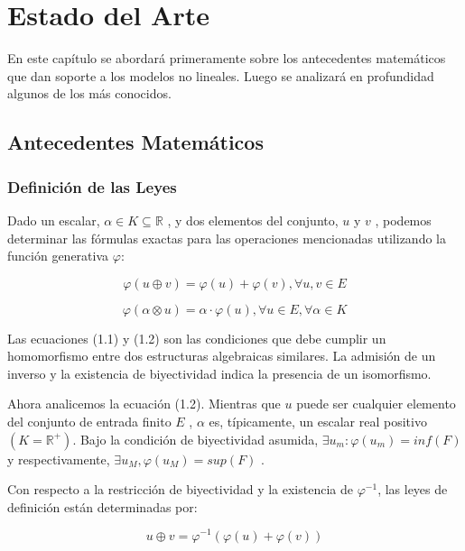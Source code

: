 \chapter{Estado del Arte}\label{chapter:state-of-the-art}

En este cap\'itulo se abordar\'a primeramente sobre los antecedentes matem\'aticos que dan soporte a los modelos no lineales. Luego se analizar\'a en profundidad algunos de los m\'as conocidos.

\section{Antecedentes Matemáticos}

\subsection{Definición de las Leyes}

Dado un escalar, $\alpha \in K \subseteq \mathbb{R}$ , y dos elementos del conjunto, $u$ y $v$ , podemos determinar las fórmulas exactas para las operaciones mencionadas utilizando la función generativa $\varphi$:

\begin{equation}
	\varphi(u\oplus v) = \varphi(u)+\varphi(v), \forall u,v \in E
\end{equation}

\begin{equation}
	\varphi(\alpha \otimes u) = \alpha \cdot \varphi(u), \forall u \in E, \forall \alpha \in K
\end{equation}

Las ecuaciones (1.1) y (1.2) son las condiciones que debe cumplir un homomorfismo entre dos estructuras algebraicas similares. La admisi\'on de un inverso y la existencia de biyectividad indica la presencia de un isomorfismo.

Ahora analicemos la ecuación (1.2). Mientras que $u$ puede ser cualquier elemento del conjunto de entrada finito $E$ , $\alpha$ es, típicamente, un escalar real positivo $(K=\mathbb{R}^+)$. Bajo la condición de biyectividad asumida, $\exists u_m: \varphi( u_m ) = inf( F )$ y respectivamente, $\exists u_M , \varphi ( u_M ) = sup( F )$ .

Con respecto a la restricción de biyectividad y la existencia de $\varphi^{-1}$, las leyes de definición están determinadas por:

\begin{equation}
	u \oplus v = \varphi^{-1}(\varphi(u)+\varphi(v))	
\end{equation}

